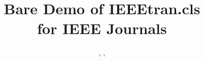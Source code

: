 \documentclass[journal]{IEEEtran}
\begin{document}


\title{Bare Demo of IEEEtran.cls\\ for IEEE Journals}

\author{
  \authorOne,
  \authorTwo,
  \authorThree
}



\maketitle













\end{document}
